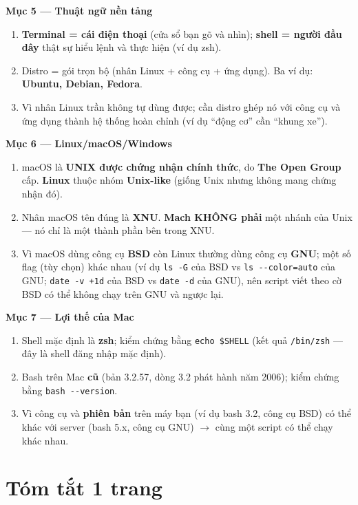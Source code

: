 \documentclass[12pt,a4paper]{article}
\begin{document}
\textbf{Mục 5 — Thuật ngữ nền tảng}
\begin{enumerate}[leftmargin=*]
  \item \textbf{Terminal = cái điện thoại} (cửa sổ bạn gõ và nhìn); \textbf{shell = người đầu dây} thật sự hiểu lệnh và thực hiện (ví dụ zsh).
  \item Distro = gói trọn bộ (nhân Linux + công cụ + ứng dụng). Ba ví dụ: \textbf{Ubuntu, Debian, Fedora}.
  \item Vì nhân Linux trần không tự dùng được; cần distro ghép nó với công cụ và ứng dụng thành hệ thống hoàn chỉnh (ví dụ ``động cơ'' cần ``khung xe'').
\end{enumerate}

\textbf{Mục 6 — Linux/macOS/Windows}
\begin{enumerate}[leftmargin=*]
  \item macOS là \textbf{UNIX được chứng nhận chính thức}, do \textbf{The Open Group} cấp. \textbf{Linux} thuộc nhóm \textbf{Unix-like} (giống Unix nhưng không mang chứng nhận đó).
  \item Nhân macOS tên đúng là \textbf{XNU}. \textbf{Mach KHÔNG phải} một nhánh của Unix — nó chỉ là một thành phần bên trong XNU.
  \item Vì macOS dùng công cụ \textbf{BSD} còn Linux thường dùng công cụ \textbf{GNU}; một số flag (tùy chọn) khác nhau (ví dụ \texttt{ls -G} của BSD vs \texttt{ls -{}-color=auto} của GNU; \texttt{date -v +1d} của BSD vs \texttt{date -d} của GNU), nên script viết theo cờ BSD có thể không chạy trên GNU và ngược lại.
\end{enumerate}

\textbf{Mục 7 — Lợi thế của Mac}
\begin{enumerate}[leftmargin=*]
  \item Shell mặc định là \textbf{zsh}; kiểm chứng bằng \texttt{echo \$SHELL} (kết quả \texttt{/bin/zsh} — đây là shell đăng nhập mặc định).
  \item Bash trên Mac \textbf{cũ} (bản 3.2.57, dòng 3.2 phát hành năm 2006); kiểm chứng bằng \texttt{bash -{}-version}.
  \item Vì công cụ và \textbf{phiên bản} trên máy bạn (ví dụ bash 3.2, công cụ BSD) có thể khác với server (bash 5.x, công cụ GNU) $\rightarrow$ cùng một script có thể chạy khác nhau.
\end{enumerate}

\section{Tóm tắt 1 trang}
\end{document}
